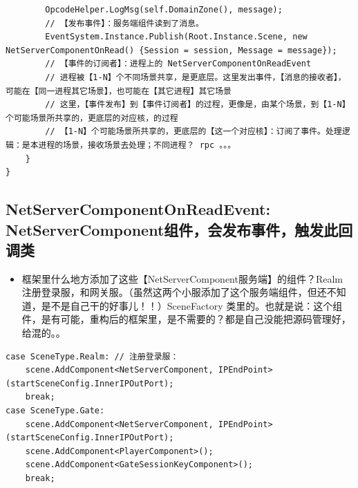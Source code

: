 \documentclass[9pt, b5paper]{article}
\begin{document}
\begin{itemize}
\begin{verbatim}
        OpcodeHelper.LogMsg(self.DomainZone(), message);
        // 【发布事件】：服务端组件读到了消息。
        EventSystem.Instance.Publish(Root.Instance.Scene, new NetServerComponentOnRead() {Session = session, Message = message});
        // 【事件的订阅者】：进程上的 NetServerComponentOnReadEvent
        // 进程被【1-N】个不同场景共享，是更底层。这里发出事件，【消息的接收者】，可能在【同一进程其它场景】，也可能在【其它进程】其它场景
        // 这里，【事件发布】到【事件订阅者】的过程，更像是，由某个场景，到【1-N】个可能场景所共享的，更底层的对应核，的过程
        // 【1-N】个可能场景所共享的，更底层的【这一个对应核】：订阅了事件。处理逻辑：是本进程的场景，接收场景去处理；不同进程？ rpc 。。。
    }
}
\end{verbatim}
\end{itemize}
\subsection{NetServerComponentOnReadEvent: NetServerComponent组件，会发布事件，触发此回调类}
\label{sec-3-5}
\begin{itemize}
\item 框架里什么地方添加了这些【NetServerComponent服务端】的组件？Realm 注册登录服，和网关服。（虽然这两个小服添加了这个服务端组件，但还不知道，是不是自己干的好事儿！！）SceneFactory 类里的。也就是说：这个组件，是有可能，重构后的框架里，是不需要的？都是自己没能把源码管理好，给混的。。
\end{itemize}
\begin{verbatim}
case SceneType.Realm: // 注册登录服：
    scene.AddComponent<NetServerComponent, IPEndPoint>(startSceneConfig.InnerIPOutPort);
    break;
case SceneType.Gate:
    scene.AddComponent<NetServerComponent, IPEndPoint>(startSceneConfig.InnerIPOutPort);
    scene.AddComponent<PlayerComponent>();
    scene.AddComponent<GateSessionKeyComponent>();
    break;
\end{verbatim}
\end{document}
